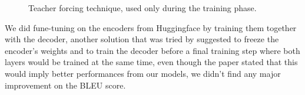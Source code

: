 \begin{figure}[H]
    \centering
    \qquad \qquad
    \caption{Teacher forcing technique, used only during the training phase.}
    \label{fig:teacher_forcing}
\end{figure}
We did fune-tuning on the encoders from Huggingface by training them together with the decoder, another solution that was tried by \cite{imamura-sumita-2019-recycling} suggested to freeze the encoder's weights and to train the decoder before a final training step where both layers would be trained at the same time, even though the paper stated that this would imply better performances from our models, we didn't find any major improvement on the BLEU score.
